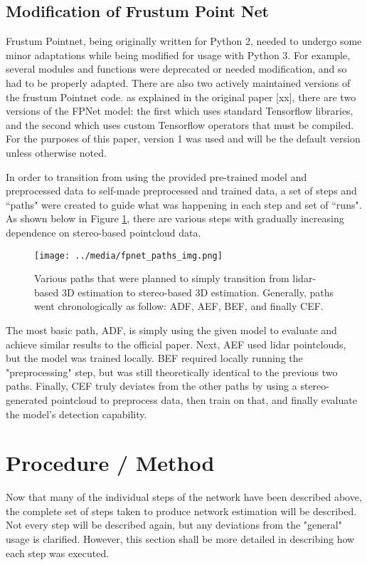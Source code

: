 \subsection{Modification of Frustum Point Net}
Frustum Pointnet, being originally written for Python 2, needed to undergo some minor adaptations while being modified for usage with Python 3. For example, several modules and functions were deprecated or needed modification, and so had to be properly adapted. There are also two actively maintained versions of the frustum Pointnet code. as explained in the original paper [xx], there are two versions of the FPNet model: the first which uses standard Tensorflow libraries, and the second which uses custom Tensorflow operators that must be compiled. For the purposes of this paper, version 1 was used and will be the default version unless otherwise noted.

In order to transition from using the provided pre-trained model and preprocessed data to self-made preprocessed and trained data, a set of steps and ``paths" were created to guide what was happening in each step and set of ``runs". As shown below in Figure \ref{fp_paths}, there are various steps with gradually increasing dependence on stereo-based pointcloud data.

\begin{figure}[h] %
    \texttt{[image: ../media/fpnet\_paths\_img.png]}
    \caption{Various paths that were planned to simply transition from lidar-based 3D estimation to stereo-based 3D estimation. Generally, paths went chronologically as follow: ADF, AEF, BEF, and finally CEF.}
    \label{fp_paths} %
\end{figure}

The most basic path, ADF, is simply using the given model to evaluate and achieve similar results to the official paper. Next, AEF used lidar pointclouds, but the model was trained locally. BEF required locally running the "preprocessing" step, but was still theoretically identical to the previous two paths. Finally, CEF truly deviates from the other paths by using a stereo-generated pointcloud to preprocess data, then train on that, and finally evaluate the model's detection capability. 

\section{Procedure / Method}
Now that many of the individual steps of the network have been described above, the complete set of steps taken to produce network estimation will be described. Not every step will be described again, but any deviations from the "general" usage is clarified. However, this section shall be more detailed in describing how each step was executed.


